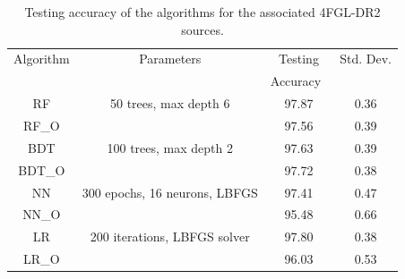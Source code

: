 \documentclass[referee]{aa} %
\begin{document}
\begin{table}[!h]
    \caption{Testing accuracy of the algorithms for the associated 4FGL-DR2 sources. }
    \label{tab:selected_algs2}

\centering
    \tiny
    \renewcommand{\tabcolsep}{0.4mm}
\renewcommand{\arraystretch}{1.6}

    \begin{tabular}{ c c c c }
    \hline
    \hline
    Algorithm&Parameters &  Testing&Std. Dev.\\
    & & Accuracy\ &  \\
    \hline
    RF& 50 trees, max depth 6  &97.87 & 0.36\\
    RF\_O   &&97.56&0.39 \\
    \hline
    BDT & 100 trees, max depth 2    &   97.63 &0.39\\
    BDT\_O&&97.72&0.38\\
    \hline
    NN & 300 epochs, 16 neurons, LBFGS  & 97.41 & 0.47\\
    NN\_O&&95.48&0.66\\
    \hline
    LR & 200 iterations, LBFGS solver & 97.80&0.38\\
    LR\_O&&96.03&0.53\\
    \hline
     
    \end{tabular}%
\end{table}
\end{document}

